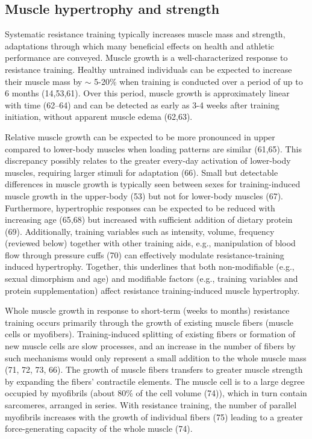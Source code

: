 \documentclass[twoside,10pt]{gihclass} %
\begin{document}
\hypertarget{muscle-hypertrophy-and-strength}{%
\subsection{Muscle hypertrophy and strength}\label{muscle-hypertrophy-and-strength}}

Systematic resistance training typically increases muscle mass and strength, adaptations through which many beneficial effects on health and athletic performance are conveyed.
Muscle growth is a well-characterized response to resistance training.
Healthy untrained individuals can be expected to increase their muscle mass by \(\sim\) 5-20\% when training is conducted over a period of up to 6 months
(14,53,61).
Over this period, muscle growth is approximately linear with time
(62--64)
and can be detected as early as 3-4 weeks after training initiation, without apparent muscle edema
(62,63).

Relative muscle growth can be expected to be more pronounced in upper compared to lower-body muscles when loading patterns are similar
(61,65).
This discrepancy possibly relates to the greater every-day activation of lower-body muscles, requiring larger stimuli for adaptation
(66).
Small but detectable differences in muscle growth is typically seen between sexes for training-induced muscle growth in the upper-body
(53)
but not for lower-body muscles
(67).
Furthermore, hypertrophic responses can be expected to be reduced with increasing age
(65,68)
but increased with sufficient addition of dietary protein
(69).
Additionally, training variables such as intensity, volume, frequency (reviewed below) together with other training aids, e.g., manipulation of blood flow through pressure cuffs
(70)
can effectively modulate resistance-training induced hypertrophy.
Together, this underlines that both non-modifiable (e.g., sexual dimorphism and age) and modifiable factors (e.g., training variables and protein supplementation) affect resistance training-induced muscle hypertrophy.

Whole muscle growth in response to short-term (weeks to months) resistance training occurs primarily through the growth of existing muscle fibers (muscle cells or myofibers).
Training-induced splitting of existing fibers or formation of new muscle cells are slow processes, and an increase in the number of fibers by such mechanisms would only represent a small addition to the whole muscle mass
(71, 72, 73, 66).
The growth of muscle fibers transfers to greater muscle strength by expanding the fibers' contractile elements.
The muscle cell is to a large degree occupied by myofibrils
(about 80\% of the cell volume
(74)),
which in turn contain sarcomeres, arranged in series.
With resistance training, the number of parallel myofibrils increases with the growth of individual fibers
(75)
leading to a greater force-generating capacity of the whole muscle
(74).
\end{document}

